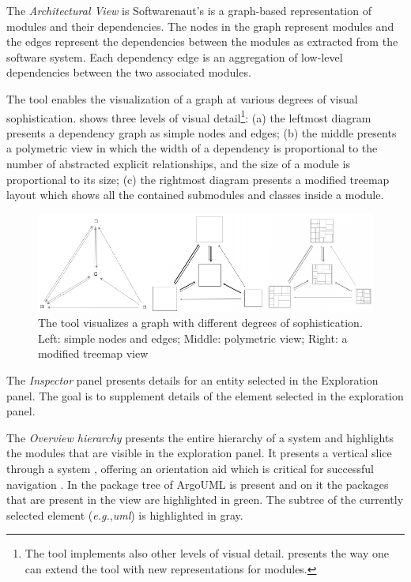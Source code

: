 \documentclass[preprint,12pt]{elsarticle}
\newcommand{\cd}[1]{{\em{#1}}}
\newcommand{\eg}{\emph{e.g.},\xspace}
\begin{document}
\begin{description}
\item The {\em Architectural View} is Softwarenaut's is a graph-based representation of modules and their dependencies. The nodes in the graph represent modules and the edges represent the dependencies between the modules as extracted from the software system. Each dependency edge is an aggregation of low-level dependencies between the two associated modules. 

The tool enables the visualization of a graph at various degrees of visual sophistication.  shows three levels of visual detail\footnote{The tool implements also other levels of visual detail.  presents the way one can extend the tool with new representations for modules.}: (a) the leftmost diagram presents a dependency graph as simple nodes and edges; (b) the middle presents a polymetric view \cite{lanza-pv} in which the width of a dependency is proportional to the number of abstracted explicit relationships, and the size of a module is proportional to its size; (c) the rightmost diagram presents a modified treemap layout which shows all the contained submodules and classes inside a module. 

\begin{figure}[h]
\begin{center}
\includegraphics[width=1.04\linewidth]{images/sofistication}
\caption{The tool visualizes a graph with different degrees of sophistication. Left: simple nodes and edges; Middle: polymetric view; Right: a modified treemap view}

\end{center}
\end{figure}

\item The {\em Inspector} panel presents details for an entity selected in the Exploration panel. The goal is to supplement details of the element selected in the exploration panel. %

\item The {\em Overview hierarchy} presents the entire hierarchy of a system and highlights the modules that are visible in the exploration panel. It presents a vertical slice through a system \cite{wong-thesis}, offering an orientation aid which is critical for successful navigation \cite{storey-awareness}. In  the package tree of ArgoUML is present and on it the packages that are present in the view are highlighted in green. The subtree of the currently selected element (\eg \cd{uml}) is highlighted in gray. 

\end{description}
\end{document}
